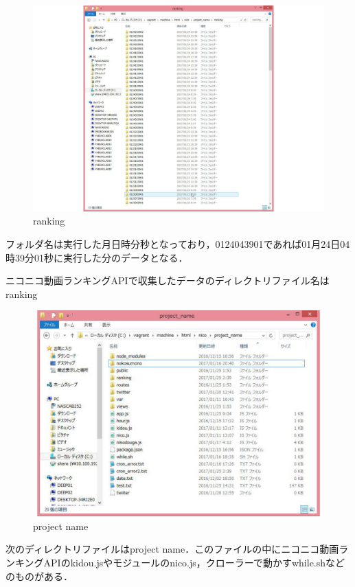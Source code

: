 \begin{figure}[htb]
\centering
\includegraphics[width=14cm]{kurora01.pdf}
\caption{ranking}\label{ace}
\end{figure}

フォルダ名は実行した月日時分秒となっており，0124043901であれば01月24日04時39分01秒に実行した分のデータとなる．

ニコニコ動画ランキングAPIで収集したデータのディレクトリファイル名はranking

\newpage

\begin{figure}[htb]
\centering
\includegraphics[width=14cm]{fairu01.pdf}
\caption{project name}\label{ace}
\end{figure}


次のディレクトリファイルはproject name．このファイルの中にニコニコ動画ランキングAPIのkidou.jsやモジュールのnico.js，クローラーで動かすwhile.shなどのものがある．
\clearpage

